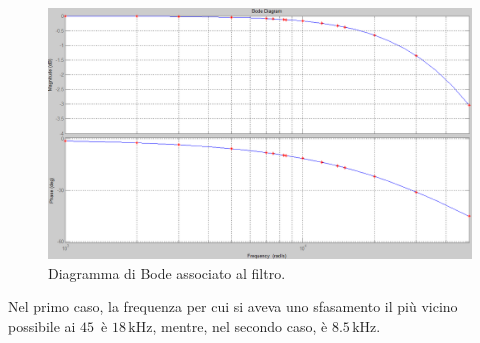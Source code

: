 \documentclass[a4paper]{article}
\begin{document}
			\begin{figure}[h!]
				\centering
				\includegraphics[scale=0.4]{filtroPassaBassoDueCondensatoriBode}
				\caption{Diagramma di Bode associato al filtro.}
				\label{fig:filtroPassaBassoDueCondensatoriBode}
			\end{figure}
			\newline
			Nel primo caso, la frequenza per cui si aveva uno sfasamento il più vicino possibile ai $ 45 $\textdegree \ è $ 18 \, \mathrm{kHz} $, mentre, nel secondo caso, è $ 8.5 \, \mathrm{kHz} $.
\end{document}
